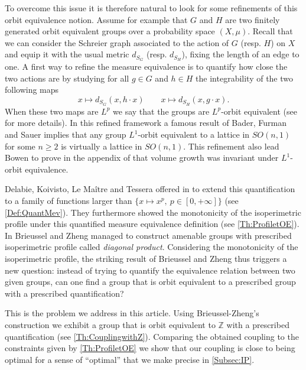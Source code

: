 \documentclass[english, 11pt, a4paper]{article}
\theoremstyle{definition}
\numberwithin{equation}{section}
\newcommand{\bZ}{\mathbb{Z}}
\begin{document}
To overcome this issue it is therefore natural to look for some refinements of this 
orbit equivalence notion.
Assume for example that $G$ and $H$ are two finitely
generated orbit equivalent groups over a probability space $(X,\mu)$. Recall
that we can consider the Schreier graph associated to the action of $G$ (resp. $H$)
on $X$ and equip it with the usual metric $d_{S_G}$ (resp. $d_{S_H}$), fixing the
length of an edge to one. 
A first way to refine the measure equivalence is to quantify how close the two
actions are by studying for all $g\in G$ and $h\in H$ the integrability of the
two following maps 
\begin{equation*}
  x\mapsto d_{S_G}(x,h\cdot x) \qquad x\mapsto d_{S_H}(x,g\cdot x). 
\end{equation*}
When these two maps are $L^p$ we say that the groups are $L^p$-orbit
equivalent (see \cite{BFSIntegrability} for more details). In this refined
framework a famous result of Bader, Furman and Sauer \cite{BFSIntegrability}
implies that
any group $L^1$-orbit equivalent to a lattice in $SO(n, 1)$ for some $n\geq 2$ is 
virtually a lattice in $SO(n,1)$. This refinement also lead Bowen to prove in
the appendix of \cite{AustinBowen} that volume growth was invariant under
$L^1$-orbit equivalence.

Delabie, Koivisto, Le Maître and Tessera offered in \cite{DKLMT} to
extend this quantification to a family of functions larger than $\{x\mapsto x^p,
\ p\in [0,+\infty]\}$ (see \cref{Def:QuantMev}).
They furthermore showed the monotonicity of the isoperimetric profile under this  
quantified measure equivalence definition (see \cref{Th:ProfiletOE}). In
\cite{BZ} Brieussel and Zheng managed to construct amenable groups with
prescribed isoperimetric profile called \emph{diagonal product}. Considering the
monotonicity of the isoperimetric profile, the striking result of Brieussel and
Zheng thus triggers a new  question: instead of trying to quantify the
equivalence relation between two given groups, can one find a group that is
orbit equivalent to a prescribed group with a prescribed quantification? 

This is the problem we address in this article. Using Brieussel-Zheng’s construction we
exhibit a group that is orbit equivalent to $\bZ$ with a prescribed
quantification (see \cref{Th:CouplingwithZ}). Comparing the obtained coupling
to the constraints given by \cref{Th:ProfiletOE} 
we show that our coupling is close to being optimal for a sense of “optimal”
that we make precise in \cref{Subsec:IP}.
\end{document}
